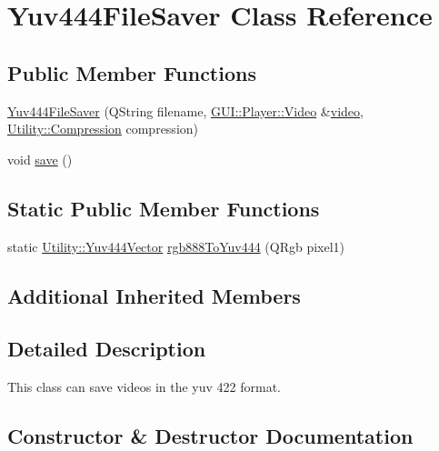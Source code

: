 \hypertarget{classUtility_1_1Yuv444FileSaver}{}\section{Yuv444\+File\+Saver Class Reference}
\label{classUtility_1_1Yuv444FileSaver}
\subsection*{Public Member Functions}
\begin{DoxyCompactItemize}
\item 
\hyperlink{classUtility_1_1Yuv444FileSaver_ac5a7100eea65b8418588dc8636b098e4}{Yuv444\+File\+Saver} (Q\+String filename, \hyperlink{classGUI_1_1Player_1_1Video}{G\+U\+I\+::\+Player\+::\+Video} \&\hyperlink{classUtility_1_1YuvFileSaver_ac39cb6d0a56308ca6323374fc0d74c96}{video}, \hyperlink{namespaceUtility_a56a83bf6847f4801f4205eb4be237ccf}{Utility\+::\+Compression} compression)
\item 
void \hyperlink{classUtility_1_1Yuv444FileSaver_aae2c382151ef7c9aa913361172b30db6}{save} ()
\end{DoxyCompactItemize}
\subsection*{Static Public Member Functions}
\begin{DoxyCompactItemize}
\item 
static \hyperlink{classUtility_1_1Yuv444Vector}{Utility\+::\+Yuv444\+Vector} \hyperlink{classUtility_1_1Yuv444FileSaver_a9016ab21bfb4c4741ed30631f7808ed4}{rgb888\+To\+Yuv444} (Q\+Rgb pixel1)
\end{DoxyCompactItemize}
\subsection*{Additional Inherited Members}


\subsection{Detailed Description}
This class can save videos in the yuv 422 format. 

\subsection{Constructor \& Destructor Documentation}
\hypertarget{classUtility_1_1Yuv444FileSaver_ac5a7100eea65b8418588dc8636b098e4}{}
